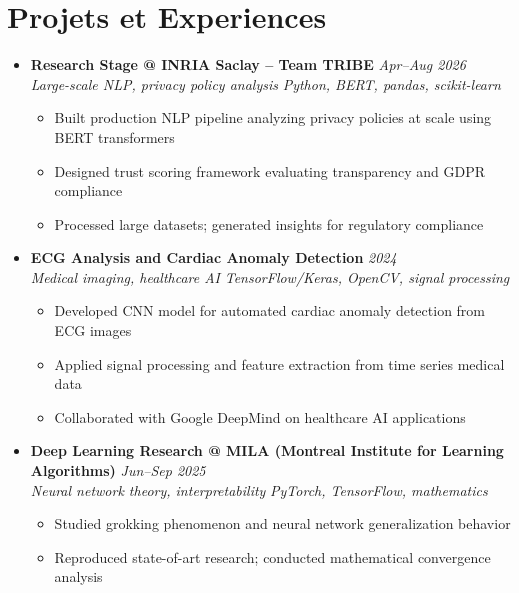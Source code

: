 \documentclass[a4paper,11pt]{article}
\begin{document}
\section{Projets et Experiences}
\begin{itemize}[leftmargin=*, label={-}]

\item \textbf{Research Stage @ INRIA Saclay -- Team TRIBE} \hfill \textit{Apr--Aug 2026} \\
\textit{Large-scale NLP, privacy policy analysis} \hfill \textit{Python, BERT, pandas, scikit-learn}
\vspace{-2pt}
    \begin{itemize}[leftmargin=0.4cm, nosep, label=\tiny$\bullet$]
        \item \small{Built production NLP pipeline analyzing privacy policies at scale using BERT transformers}
        \item \small{Designed trust scoring framework evaluating transparency and GDPR compliance}
        \item \small{Processed large datasets; generated insights for regulatory compliance}
    \end{itemize}
\vspace{3pt}

\item \textbf{ECG Analysis and Cardiac Anomaly Detection} \hfill \textit{2024} \\
\textit{Medical imaging, healthcare AI} \hfill \textit{TensorFlow/Keras, OpenCV, signal processing}
\vspace{-2pt}
    \begin{itemize}[leftmargin=0.4cm, nosep, label=\tiny$\bullet$]
        \item \small{Developed CNN model for automated cardiac anomaly detection from ECG images}
        \item \small{Applied signal processing and feature extraction from time series medical data}
        \item \small{Collaborated with Google DeepMind on healthcare AI applications}
    \end{itemize}
\vspace{3pt}

\item \textbf{Deep Learning Research @ MILA (Montreal Institute for Learning Algorithms)} \hfill \textit{Jun--Sep 2025} \\
\textit{Neural network theory, interpretability} \hfill \textit{PyTorch, TensorFlow, mathematics}
\vspace{-2pt}
    \begin{itemize}[leftmargin=0.4cm, nosep, label=\tiny$\bullet$]
        \item \small{Studied grokking phenomenon and neural network generalization behavior}
        \item \small{Reproduced state-of-art research; conducted mathematical convergence analysis}
    \end{itemize}
\vspace{3pt}


\end{itemize}
\end{document}
